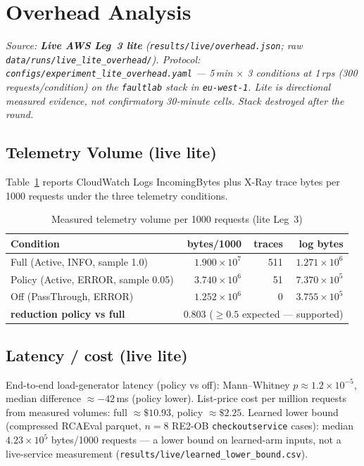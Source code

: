 \section{Overhead Analysis}
\label{sec:overhead_results}

\textit{Source: \textbf{Live AWS Leg~3 lite} (\texttt{results/live/overhead.json}; raw \texttt{data/runs/live\_lite\_overhead/}). Protocol: \texttt{configs/experiment\_lite\_overhead.yaml} --- 5\,min $\times$ 3 conditions at 1\,rps (300 requests/condition) on the \texttt{faultlab} stack in \texttt{eu-west-1}. Lite is directional measured evidence, not confirmatory 30-minute cells. Stack destroyed after the round.}

\subsection{Telemetry Volume (live lite)}

Table~\ref{tab:overhead_volume} reports CloudWatch Logs IncomingBytes plus X-Ray trace bytes per 1000 requests under the three telemetry conditions.

\begin{table}[h]
\centering
\caption{Measured telemetry volume per 1000 requests (lite Leg~3)}
\label{tab:overhead_volume}
\begin{tabular}{lrrr}
\hline
\textbf{Condition} & \textbf{bytes/1000} & \textbf{traces} & \textbf{log bytes} \\
\hline
Full (Active, INFO, sample 1.0) & $1.900\times10^{7}$ & 511 & $1.271\times10^{6}$ \\
Policy (Active, ERROR, sample 0.05) & $3.740\times10^{6}$ & 51 & $7.370\times10^{5}$ \\
Off (PassThrough, ERROR) & $1.252\times10^{6}$ & 0 & $3.755\times10^{5}$ \\
\hline
\textbf{reduction policy vs full} & \multicolumn{3}{r}{$0.803$ ($\geq 0.5$ expected --- supported)} \\
\hline
\end{tabular}
\end{table}

\subsection{Latency / cost (live lite)}

End-to-end load-generator latency (policy vs off): Mann--Whitney $p\approx1.2\times10^{-5}$, median difference $\approx -42$\,ms (policy lower). List-price cost per million requests from measured volumes: full $\approx\$10.93$, policy $\approx\$2.25$. Learned lower bound (compressed RCAEval parquet, $n{=}8$ RE2-OB \texttt{checkoutservice} cases): median $4.23\times10^{5}$ bytes/1000 requests --- a lower bound on learned-arm inputs, not a live-service measurement (\texttt{results/live/learned\_lower\_bound.csv}).

